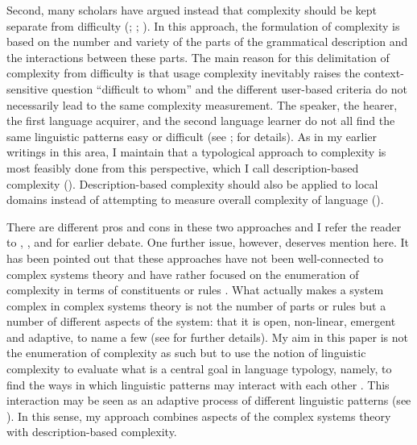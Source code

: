 \documentclass[output=collectionpaper]{langsci/langscibook}
\begin{document}
Second, many scholars have argued instead that complexity should be kept separate from difficulty (\citealt{Dahl2004}; \citealt{Miestamo2008}; \citealt{Sinnemaeki2011}). In this approach, the formulation of complexity is based on the number and variety of the parts of the grammatical description and the interactions between these parts. The main reason for this delimitation of complexity from difficulty is that usage complexity inevitably raises the context-sensitive question ``difficult to whom'' and the different user-based criteria do not necessarily lead to the same complexity measurement. The speaker, the hearer, the first language acquirer, and the second language learner do not all find the same linguistic patterns easy or difficult (see \citealt{Miestamo2008}; \citealt{Sinnemaeki2011} for details). As in my earlier writings in this area, I maintain that a typological approach to complexity is most feasibly done from this perspective, which I call description-based complexity (\citealt{Sinnemaeki2014}). Description-based complexity should also be applied to local domains instead of attempting to measure overall complexity of language (\citealt{Sinnemaeki2011}).

There are different pros and cons in these two approaches and I refer the reader to \citet{Miestamo2008}, \citet{Kusters2008}, and \citet{Sinnemaeki2011} for earlier debate. One further issue, however, deserves mention here. It has been pointed out that these approaches have not been well-connected to complex systems theory and have rather focused on the enumeration of complexity in terms of constituents or rules \citep{Andrason2014}. What actually makes a system complex in complex systems theory is not the number of parts or rules but a number of different aspects of the system: that it is open, non-linear, emergent and adaptive, to name a few (see \citealt{Kretzschmar2015} for further details). My aim in this paper is not the enumeration of complexity as such but to use the notion of linguistic complexity to evaluate what is a central goal in language typology, namely, to find the ways in which linguistic patterns may interact with each other \citep{Bickel2007a}. This interaction may be seen as an adaptive process of different linguistic patterns (see ). In this sense, my approach combines aspects of the complex systems theory with description-based complexity.
\end{document}
